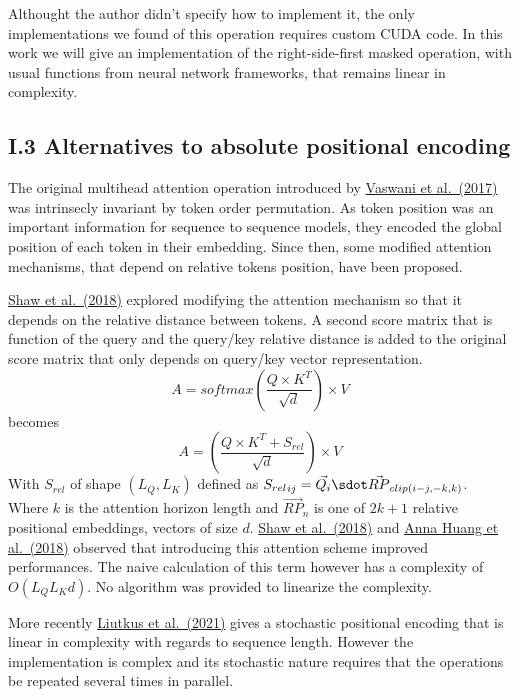 Althought the author didn't specify how to implement it, the only
implementations we found of this operation requires custom CUDA code. In
this work we will give an implementation of the right-side-first masked
operation, with usual functions from neural network frameworks, that
remains linear in complexity.

\hypertarget{i.3-alternatives-to-absolute-positional-encoding}{%
\subsection{I.3 Alternatives to absolute positional
encoding}\label{i.3-alternatives-to-absolute-positional-encoding}}

The original multihead attention operation introduced by
\href{https://arxiv.org/abs/1706.03762}{Vaswani et al.~(2017)} was
intrinsecly invariant by token order permutation. As token position was
an important information for sequence to sequence models, they encoded
the global position of each token in their embedding. Since then, some
modified attention mechanisms, that depend on relative tokens position,
have been proposed.

\href{https://arxiv.org/abs/1803.02155}{Shaw et al.~(2018)} explored
modifying the attention mechanism so that it depends on the relative
distance between tokens. A second score matrix that is function of the
query and the query/key relative distance is added to the original score
matrix that only depends on query/key vector representation.
\[A = softmax\left(\frac{Q \times K^T}{\sqrt{d}}\right) \times V\]
becomes
\[A = \left(\frac{Q \times K^T + S_{rel}}{\sqrt{d}}\right) \times V\]
With \(S_{rel}\) of shape \((L_Q, L_K)\) defined as
\({S_{rel}}_{ij} = \vec{Q_i} \sdot \vec{RP}_{clip(i-j, -k, k)}\). Where
\(k\) is the attention horizon length and \(\vec{RP}_n\) is one of
\(2k+1\) relative positional embeddings, vectors of size \(d\).
\href{https://arxiv.org/abs/1803.02155}{Shaw et al.~(2018)} and
\href{https://arxiv.org/abs/1809.04281}{Anna Huang et al.~(2018)}
observed that introducing this attention scheme improved performances.
The naive calculation of this term however has a complexity of
\(O(L_QL_Kd)\). No algorithm was provided to linearize the complexity.

More recently \href{https://arxiv.org/abs/2105.08399}{Liutkus et
al.~(2021)} gives a stochastic positional encoding that is linear in
complexity with regards to sequence length. However the implementation
is complex and its stochastic nature requires that the operations be
repeated several times in parallel.

